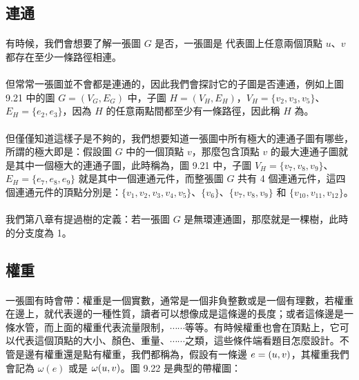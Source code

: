 \documentclass[12pt,a4paper,oneside]{report}
\begin{document}
\begin{CJK}{UTF8}{bkai}
\subsection{連通}
\paragraph{}有時候，我們會想要了解一張圖 $G$ 是否\textbf{}，一張圖是\textbf{} 代表圖上任意兩個頂點 $u$、$v$ 都存在至少一條路徑相連。
\paragraph{}但常常一張圖並不會都是連通的，因此我們會探討它的子圖是否連通，例如上圖 9.21 中的圖 $G=(V_G,E_G)$ 中，子圖 $H=(V_H,E_H)$，$V_H=\{{v_2,v_3,v_5}\}$、$E_H=\{{e_2,e_3}\}$，因為 $H$ 的任意兩點間都至少有一條路徑，因此稱 $H$ 為\textbf{}。
\paragraph{}但僅僅知道這樣子是不夠的，我們想要知道一張圖中所有極大的連通子圖有哪些，所謂的極大即是：假設圖 $G$ 中的一個頂點 $v$，那麼包含頂點 $v$ 的最大連通子圖就是其中一個極大的連通子圖，此時稱為\textbf{}，圖 9.21 中，子圖 $V_H=\{{v_7,v_8,v_9}\}$、$E_H=\{{e_7,e_8,e_9}\}$ 就是其中一個連通元件，而整張圖 $G$ 共有 4 個連通元件，這四個連通元件的頂點分別是：$\{v_1,v_2,v_3,v_4,v_5\}$、$\{v_6\}$、$\{v_7,v_8,v_9\}$ 和 $\{v_{10},v_{11},v_{12}\}$。
\paragraph{}我們第八章有提過樹的定義：若一張圖 $G$ 是無環連通圖，那麼就是一棵樹，此時 的分支度為 1。

\subsection{權重}
\paragraph{}一張圖有時會帶\textbf{}：權重是一個實數，通常是一個非負整數或是一個有理數，若權重在邊上，就代表邊的一種性質，讀者可以想像成是這條邊的長度；或者這條邊是一條水管，而上面的權重代表流量限制，$\cdots\cdots$等等。有時候權重也會在頂點上，它可以代表這個頂點的大小、顏色、重量、$\cdots\cdots$之類，這些條件端看題目怎麼設計。不管是邊有權重還是點有權重，我們都稱為\textbf{}，假設有一條邊 $e=({u},{v})$，其權重我們會記為 $\omega{(e)}$ 或是 $\omega{\ensuremath{({u},{v})}}$。圖 9.22 是典型的帶權圖：


\end{CJK}
\end{document}
